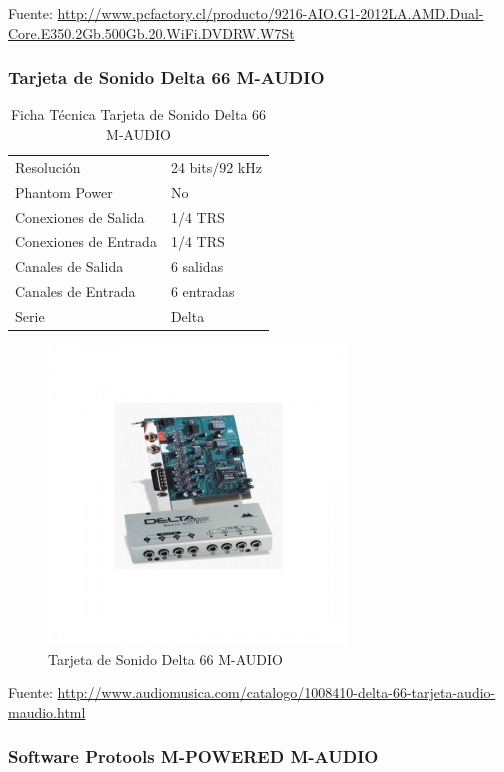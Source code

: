 Fuente: \url{http://www.pcfactory.cl/producto/9216-AIO.G1-2012LA.AMD.Dual-Core.E350.2Gb.500Gb.20.WiFi.DVDRW.W7St}
\newpage
\subsubsection*{Tarjeta de Sonido Delta 66 M-AUDIO}

\begin{table}[htb!]
\centering
\begin{tabular}{|l|l|}
\hline
Resolución & 24 bits/92 kHz \\
Phantom Power & No \\
Conexiones de Salida & 1/4 TRS\\
Conexiones de Entrada & 1/4 TRS\\
Canales de Salida & 6 salidas\\
Canales de Entrada & 6 entradas\\
Serie & Delta \\
\hline
\end{tabular}
\caption{Ficha Técnica Tarjeta de Sonido Delta 66 M-AUDIO}
\end{table}

\begin{figure}[h!t]
   \centering
  \includegraphics[scale=0.5]{img/tarjetasonido.jpg}
   \caption{Tarjeta de Sonido Delta 66 M-AUDIO}
   \label{fig:tarjetasonido}
\end{figure}

Fuente: \url{http://www.audiomusica.com/catalogo/1008410-delta-66-tarjeta-audio-maudio.html}

\subsubsection*{Software Protools M-POWERED M-AUDIO}

